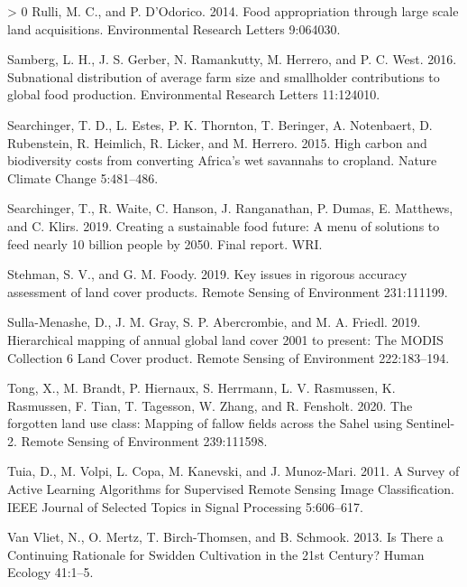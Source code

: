 \documentclass[11pt,a4paper]{article}
\newlength{\cslhangindent}
\newenvironment{CSLReferences}[3] %
 {%
  \setlength{\parindent}{0pt}
  \ifodd #1 \everypar{\setlength{\hangindent}{\cslhangindent}}\ignorespaces\fi
  \ifnum #2 > 0
  \setlength{\parskip}{#2\baselineskip}
  \fi
 }%
 {}
\begin{document}
\begin{CSLReferences}{1}{0}
\leavevmode\hypertarget{ref-RulliFoodappropriationlarge2014}{}%
Rulli, M. C., and P. D'Odorico. 2014. Food appropriation through large
scale land acquisitions. Environmental Research Letters 9:064030.

\leavevmode\hypertarget{ref-SambergSubnationaldistributionaverage2016}{}%
Samberg, L. H., J. S. Gerber, N. Ramankutty, M. Herrero, and P. C. West.
2016. Subnational distribution of average farm size and smallholder
contributions to global food production. Environmental Research Letters
11:124010.

\leavevmode\hypertarget{ref-SearchingerHighcarbonbiodiversity2015}{}%
Searchinger, T. D., L. Estes, P. K. Thornton, T. Beringer, A.
Notenbaert, D. Rubenstein, R. Heimlich, R. Licker, and M. Herrero. 2015.
High carbon and biodiversity costs from converting {Africa}'s wet
savannahs to cropland. Nature Climate Change 5:481--486.

\leavevmode\hypertarget{ref-searchingerCreatingSustainableFood2019}{}%
Searchinger, T., R. Waite, C. Hanson, J. Ranganathan, P. Dumas, E.
Matthews, and C. Klirs. 2019. Creating a sustainable food future: A menu
of solutions to feed nearly 10 billion people by 2050. {Final} report.
{WRI}.

\leavevmode\hypertarget{ref-StehmanKeyissuesrigorous2019}{}%
Stehman, S. V., and G. M. Foody. 2019. Key issues in rigorous accuracy
assessment of land cover products. Remote Sensing of Environment
231:111199.

\leavevmode\hypertarget{ref-sulla-menasheHierarchicalMappingAnnual2019}{}%
Sulla-Menashe, D., J. M. Gray, S. P. Abercrombie, and M. A. Friedl.
2019. Hierarchical mapping of annual global land cover 2001 to present:
The {MODIS Collection} 6 {Land Cover} product. Remote Sensing of
Environment 222:183--194.

\leavevmode\hypertarget{ref-Tongforgottenlanduse2020}{}%
Tong, X., M. Brandt, P. Hiernaux, S. Herrmann, L. V. Rasmussen, K.
Rasmussen, F. Tian, T. Tagesson, W. Zhang, and R. Fensholt. 2020. The
forgotten land use class: Mapping of fallow fields across the {Sahel}
using {Sentinel}-2. Remote Sensing of Environment 239:111598.

\leavevmode\hypertarget{ref-tuiaSurveyActiveLearning2011}{}%
Tuia, D., M. Volpi, L. Copa, M. Kanevski, and J. Munoz-Mari. 2011. A
{Survey} of {Active Learning Algorithms} for {Supervised Remote Sensing
Image Classification}. IEEE Journal of Selected Topics in Signal
Processing 5:606--617.

\leavevmode\hypertarget{ref-vanvlietThereContinuingRationale2013}{}%
Van Vliet, N., O. Mertz, T. Birch-Thomsen, and B. Schmook. 2013. Is
{There} a {Continuing Rationale} for {Swidden Cultivation} in the 21st
{Century}? Human Ecology 41:1--5.


\end{CSLReferences}
\end{document}
